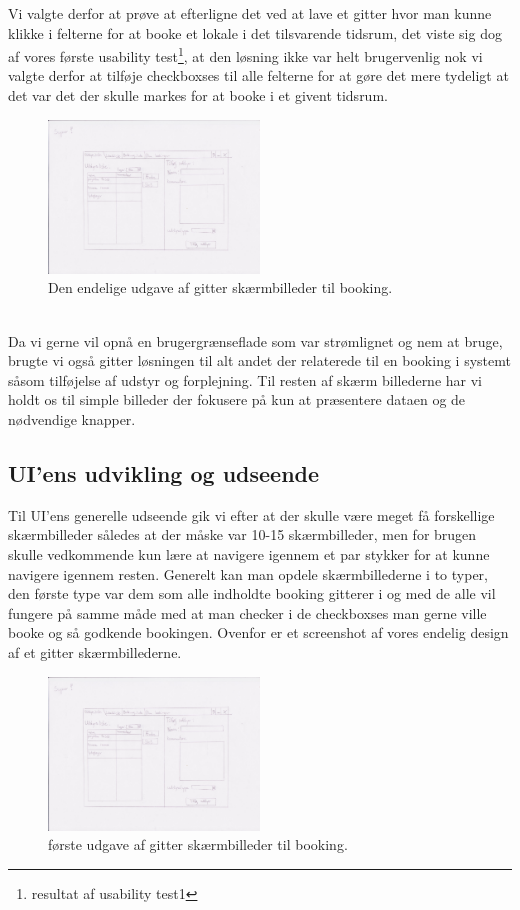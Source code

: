 Vi valgte derfor at prøve at efterligne det ved at lave et gitter hvor man kunne klikke i felterne for at booke et lokale i det tilsvarende tidsrum, det viste sig dog af vores første usability test\footnote{resultat af usability test1}, at den løsning ikke var helt brugervenlig nok vi valgte derfor at tilføje checkboxses til alle felterne for at gøre det mere tydeligt at det var det der skulle markes for at booke i et givent tidsrum.
\begin{figure}[h!]
  \caption{Den endelige udgave af gitter skærmbilleder til booking.}
  \centering
    \includegraphics[width=0.5\textwidth]{Appendix/GUI-Prototype/PaperMockup/UdstyrsListe}
\end{figure}
\\Da vi gerne vil opnå en brugergrænseflade som var strømlignet og nem at bruge, brugte vi også gitter løsningen til alt andet der relaterede til en booking i systemt såsom tilføjelse af  udstyr og forplejning. Til resten af skærm billederne har vi holdt os til simple billeder der fokusere på kun at præsentere dataen og de nødvendige knapper.

\subsection{UI'ens udvikling og udseende}
Til UI'ens generelle udseende gik vi efter at der skulle være meget få forskellige skærmbilleder således at der måske var 10-15 skærmbilleder, men for brugen skulle vedkommende kun lære at navigere igennem et par stykker for at kunne navigere igennem resten.
Generelt kan man opdele skærmbillederne i to typer, den første type var dem som alle indholdte booking gitterer i og med de alle vil fungere på samme måde med at man checker i de checkboxses man gerne ville booke og så godkende bookingen.
Ovenfor er et screenshot af vores endelig design af et gitter skærmbillederne.
\begin{figure}[h!]
  \caption{første udgave af gitter skærmbilleder til booking.}
  \centering
    \includegraphics[width=0.5\textwidth]{Appendix/GUI-Prototype/PaperMockup/UdstyrsListe}
\end{figure}


